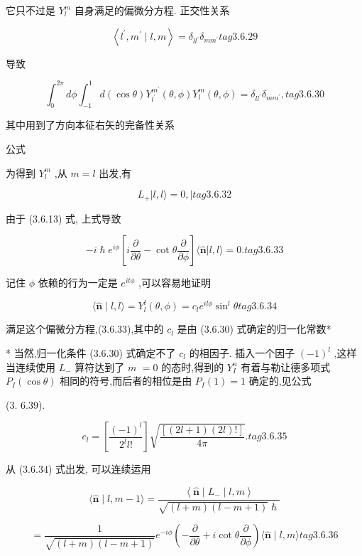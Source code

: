 它只不过是 ${Y}_{l}^{m}$ 自身满足的偏微分方程. 正交性关系

$$
\left\langle {{l}^{\prime },{m}^{\prime } \mid l, m}\right\rangle = {\delta }_{l{l}^{\prime }}{\delta }_{m{m}^{\prime }} tag{3.6.29}
$$

导致

$$
{\int }_{0}^{2\pi }{d\phi }{\int }_{-1}^{1}d\left( {\cos \theta }\right) {Y}_{{l}^{\prime }}^{{m}^{\prime }}\left( {\theta ,\phi }\right) {Y}_{l}^{m}\left( {\theta ,\phi }\right) = {\delta }_{l{l}^{\prime }}{\delta }_{m{m}^{\prime }}, tag{3. 6.30}
$$

其中用到了方向本征右矢的完备性关系

公式

为得到 ${Y}_{l}^{m}$ ,从 $m = l$ 出发,有

$$
{L}_{ + }\left| {l, l\rangle = 0,}\right| tag{3. 6.32}
$$

由于 (3.6.13) 式, 上式导致

$$
- i\hslash {e}^{i\phi }\left\lbrack {i\frac{\partial }{\partial \theta } - \cot \theta \frac{\partial }{\partial \phi }}\right\rbrack \langle \widehat{\mathbf{n}}|l, l\rangle = 0. tag{3. 6.33}
$$

记住 $\phi$ 依赖的行为一定是 ${e}^{it\phi }$ ,可以容易地证明

$$
\langle \widehat{\mathbf{n}} \mid l, l\rangle = {Y}_{l}^{l}\left( {\theta ,\phi }\right) = {c}_{l}{e}^{il\phi }{\sin }^{l}\theta tag{3. 6.34}
$$

满足这个偏微分方程,(3.6.33),其中的 ${c}_{l}$ 是由 (3.6.30) 式确定的归一化常数*

* 当然,归一化条件 (3.6.30) 式确定不了 ${c}_{l}$ 的相因子. 插入一个因子 ${\left( -1\right) }^{l}$ ,这样当连续使用 ${L}_{ - }$ 算符达到了 $m$ $= 0$ 的态时,得到的 ${Y}_{I}^{n}$ 有着与勒让德多项式 ${P}_{I}\left( {\cos \theta }\right)$ 相同的符号,而后者的相位是由 ${P}_{I}\left( 1\right) = 1$ 确定的,见公式

(3. 6.39).

$$
{c}_{l} = \left\lbrack \frac{{\left( -1\right) }^{l}}{{2}^{l}l!}\right\rbrack \sqrt{\frac{\left\lbrack \left( 2l + 1\right) \left( 2l\right) !\right\rbrack }{4\pi }}. tag{3. 6.35}
$$

从 (3.6.34) 式出发, 可以连续运用

$$
\langle \widehat{\mathbf{n}} \mid l, m - 1\rangle = \frac{\left\langle \widehat{\mathbf{n}} \mid {L}_{ - } \mid l, m\right\rangle }{\sqrt{\left( {l + m}\right) \left( {l - m + 1}\right) }\hslash }
$$

$$
= \frac{1}{\sqrt{\left( {l + m}\right) \left( {l - m + 1}\right) }}{e}^{-{i\phi }}\left( {-\frac{\partial }{\partial \theta } + i\cot \theta \frac{\partial }{\partial \phi }}\right) \langle \widehat{\mathbf{n}} \mid l, m\rangle tag{3.6.36}
$$

